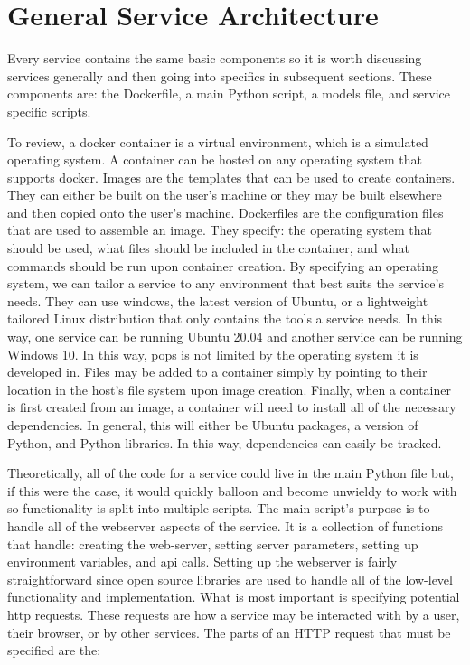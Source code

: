 \section{General Service Architecture}

Every service contains the same basic components so it is worth discussing
services generally and then going into specifics in subsequent sections. These
components are: the Dockerfile, a main Python script, a models file, and
service specific scripts.

To review, a docker container is a virtual environment, which is a simulated
operating system. A container can be hosted on any operating system that
supports docker. Images are the templates that can be used to create
containers. They can either be built on the user's machine or they may be built
elsewhere and then copied onto the user's machine. Dockerfiles are the
configuration files that are used to assemble an image. They specify: the
operating system that should be used, what files should be included in the
container, and what commands should be run upon container creation. By
specifying an operating system, we can tailor a service to any environment that
best suits the service's needs.  They can use windows, the latest version of
Ubuntu, or a lightweight tailored Linux distribution that only contains the
tools a service needs. In this way, one service can be running Ubuntu 20.04
and another service can be running Windows 10. In this way, \gls{pops} is not
limited by the operating system it is developed in.  Files may be added to a
container simply by pointing to their location in the host's file system upon
image creation.  Finally, when a container is first created from an image, a
container will need to install all of the necessary dependencies. In general,
this will either be Ubuntu packages, a version of Python, and Python libraries.
In this way, dependencies can easily be tracked. 

Theoretically, all of the code for a service could live in the main Python file
but, if this were the case, it would quickly balloon and become unwieldy to
work with so functionality is split into multiple scripts. The main script's
purpose is to handle all of the webserver aspects of the service. It is a
collection of functions that handle: creating the web-server, setting server
parameters, setting up environment variables, and \gls{api} calls.  Setting up
the webserver is fairly straightforward since open source libraries are used to
handle all of the low-level functionality and implementation. What is most
important is specifying potential \gls{http} requests. These requests are how a
service may be interacted with by a user, their browser, or by other services.
The parts of an HTTP request that must be specified are the: 


